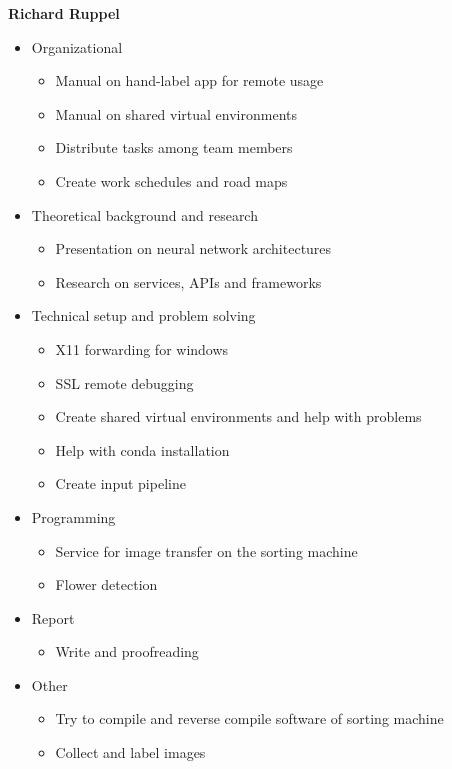 \bigskip
\textbf{Richard Ruppel}
\begin{itemize}
	\item Organizational
	\begin{itemize}
		\item Manual on hand-label app for remote usage
		\item Manual on shared virtual environments
		\item Distribute tasks among team members
		\item Create work schedules and road maps
	\end{itemize}
	\item Theoretical background and research
	\begin{itemize}
		\item Presentation on neural network architectures
		\item Research on services, APIs and frameworks
	\end{itemize}
	\item Technical setup and problem solving
	\begin{itemize}
		\item X11 forwarding for windows
		\item SSL remote debugging
		\item Create shared virtual environments and help with problems
		\item Help with conda installation
		\item Create input pipeline
	\end{itemize}
	\item Programming
	\begin{itemize}
		\item Service for image transfer on the sorting machine
		\item Flower detection
	\end{itemize}
	\item Report
	\begin{itemize}
		\item Write and proofreading
	\end{itemize}
	\item Other
	\begin{itemize}
		\item Try to compile and reverse compile software of sorting machine
		\item Collect and label images
	\end{itemize}
\end{itemize}

